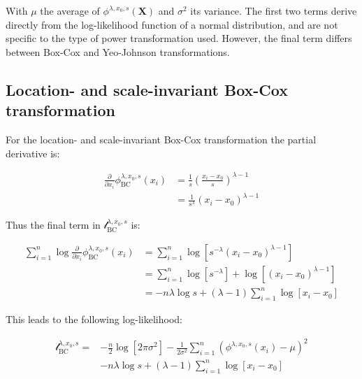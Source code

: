 \documentclass[preprint,12pt,authoryear]{elsarticle}
\begin{document}
With \(\mu\) the average of \(\phi^{\lambda, x_0, s}(\mathbf{X})\) and
\(\sigma^2\) its variance. The first two terms derive directly from the
log-likelihood function of a normal distribution, and are not specific
to the type of power transformation used. However, the final term
differs between Box-Cox and Yeo-Johnson transformations.

\subsection{Location- and scale-invariant Box-Cox
transformation}\label{location--and-scale-invariant-box-cox-transformation}

For the location- and scale-invariant Box-Cox transformation the partial
derivative is:

\begin{equation}
\begin{split}
\frac{\partial}{\partial x_i} \phi_{\text{BC}}^{\lambda, x_0, s}(x_i) & = \frac{1}{s} \left(\frac{x_i - x_0}{s} \right)^{\lambda-1} \\
 & = \frac{1} {s^\lambda} \left(x_i - x_0 \right)^{\lambda - 1}
\end{split}
\end{equation}

Thus the final term in \(\mathcal{l}_{\text{BC}}^{\lambda, x_0, s}\) is:

\begin{equation}
\begin{split}
\sum_{i=1}^n \log \frac{\partial}{\partial x_i} \phi_{\text{BC}}^{\lambda, x_0, s}(x_i) & = \sum_{i=1}^n \log \left[ s^{-\lambda} (x_i - x_0)^{\lambda - 1} \right] \\
& = \sum_{i=1}^n \log \left[s^{-\lambda} \right] + \log \left[ (x_i - x_0)^{\lambda - 1} \right]\\
& = -n \lambda \log s + \left( \lambda - 1 \right) \sum_{i=1}^n \log \left[ x_i - x_0 \right]
\end{split}
\end{equation}

This leads to the following log-likelihood:

\begin{equation}
\begin{split}
\mathcal{l}_{\text{BC}}^{\lambda, x_0, s} = & -\frac{n}{2} \log \left[2 \pi \sigma^2 \right] -\frac{1}{2 \sigma^2} \sum_{i=1}^n \left( \phi^{\lambda, x_0, s}(x_i) - \mu \right)^2 \\
& -n \lambda \log s + \left( \lambda - 1 \right) \sum_{i=1}^n \log \left[ x_i - x_0 \right]
\end{split}
\end{equation}
\end{document}

